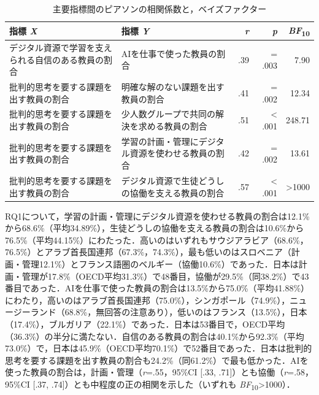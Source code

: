 \documentclass[a4paper,10pt,twocolumn]{ltjsarticle}
\makeatletter
\renewcommand{\section}{\@startsection{section}{1}{\z@}{1.1\Cvs \@plus.4\Cdp \@minus.2\Cdp}{.5\Cvs \@plus.2\Cdp}{\normalfont\gtfamily\bfseries\large}}
\makeatother
\begin{document}
\begin{table}[!t]
\caption{主要指標間のピアソンの相関係数と，ベイズファクター}
\centering\small
\begin{tabular}{>{\raggedright\arraybackslash}p{6.4cm}>{\raggedright\arraybackslash}p{6.4cm}rrr}
\toprule
指標 \textit{X} & 指標 \textit{Y} & \textit{r} & \textit{p} & \textit{BF}\textsubscript{10} \\
\midrule
デジタル資源で学習を支えられる自信のある教員の割合 & AIを仕事で使った教員の割合 & .39 & = .003 & 7.90 \\
批判的思考を要する課題を出す教員の割合 & 明確な解のない課題を出す教員の割合 & .41 & = .002 & 12.34 \\
批判的思考を要する課題を出す教員の割合 & 少人数グループで共同の解決を求める教員の割合 & .51 & < .001 & 248.71 \\
批判的思考を要する課題を出す教員の割合 & 学習の計画・管理にデジタル資源を使わせる教員の割合 & .42 & = .002 & 13.61 \\
批判的思考を要する課題を出す教員の割合 & デジタル資源で生徒どうしの協働を支える教員の割合 & .57 & < .001 & >1000 \\
\bottomrule
\end{tabular}
\par{}
\end{table}
\section{結果}
RQ1について，学習の計画・管理にデジタル資源を使わせる教員の割合は12.1\%から68.6\%（平均34.89\%），生徒どうしの協働を支える教員の割合は10.6\%から76.5\%（平均44.15\%）にわたった．高いのはいずれもサウジアラビア（68.6\%，76.5\%）とアラブ首長国連邦（67.3\%，74.3\%），最も低いのはスロベニア（計画・管理12.1\%）とフランス語圏のベルギー（協働10.6\%）であった．日本は計画・管理が17.8\%（OECD平均31.3\%）で48番目，協働が29.5\%（同38.2\%）で43番目であった．AIを仕事で使った教員の割合は13.5\%から75.0\%（平均41.88\%）にわたり，高いのはアラブ首長国連邦（75.0\%），シンガポール（74.9\%），ニュージーランド（68.8\%，無回答の注意あり），低いのはフランス（13.5\%），日本（17.4\%），ブルガリア（22.1\%）であった．日本は53番目で，OECD平均（36.3\%）の半分に満たない．自信のある教員の割合は40.1\%から92.3\%（平均73.0\%）で，日本は45.9\%（OECD平均70.1\%）で52番目であった．日本は批判的思考を要する課題を出す教員の割合も24.2\%（同61.2\%）で最も低かった．AIを使った教員の割合は，計画・管理（\textit{r}=.55，95\%CI [.33, .71]）とも協働（\textit{r}=.58，95\%CI [.37, .74]）とも中程度の正の相関を示した（いずれも \textit{BF}\textsubscript{10}>1000）．
\end{document}
